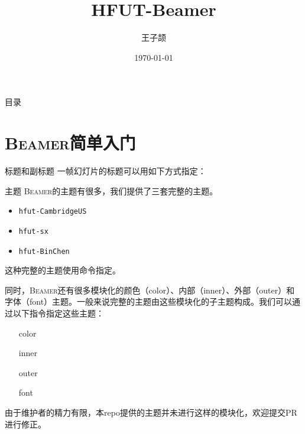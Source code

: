\documentclass[aspectratio=169]{beamer}
\title{HFUT-Beamer}
\author{王子颉}
\institute{HFUT 计算机与信息学院}
\date{\today}
\newcommand{\Beamer}{\textsc{Beamer}}
\newcommand{\enableindent}{\setlength{\parskip}{6pt}\setlength{\parindent}{2em}}
\begin{document}
\begin{frame}
	\maketitle
\end{frame}

\begin{frame}{目录}
	\tableofcontents
\end{frame}

\section{\Beamer{}简单入门}

\begin{frame}[fragile]{标题}{和副标题}
一帧幻灯片的标题可以用如下方式指定：

\end{frame}


\begin{frame}{主题}
	\enableindent
	\Beamer 的主题有很多，我们提供了三套完整的主题。
	\begin{itemize}
		\item \texttt{hfut-CambridgeUS}
		\item \texttt{hfut-sx}
		\item \texttt{hfut-BinChen}
	\end{itemize}

	这种完整的主题使用\texttt{\usetheme}命令指定。

	\framebreak

	同时，\Beamer 还有很多模块化的颜色（color）、内部（inner）、外部（outer）和字体（font）主题。一般来说完整的主题由这些模块化的子主题构成。我们可以通过以下指令指定这些主题：
	\begin{itemize}
		\item[color] \texttt{\usecolortheme}
		\item[inner] \texttt{\useinnertheme}
		\item[outer] \texttt{\useoutertheme}
		\item[font] \texttt{\usefonttheme}
	\end{itemize}

	由于维护者的精力有限，本repo提供的主题并未进行这样的模块化，欢迎提交PR进行修正。

\end{frame}
\end{document}
